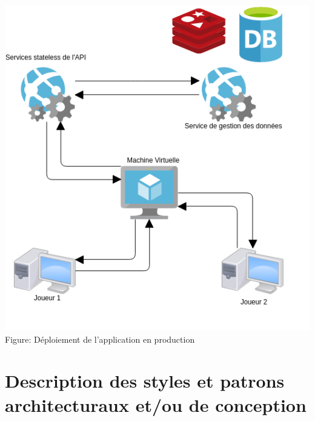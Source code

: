 \documentclass[12pt]{article}
\begin{document}
\begin{center}
\includegraphics[scale = 0.5]{deploiement.png} \\
Figure: Déploiement de l'application en production
\\[1.0 cm]
\end{center}

\section{Description des styles et patrons architecturaux et/ou de conception} 

\end{document}
